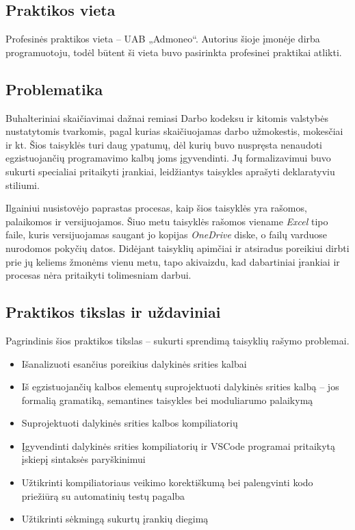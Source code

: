 
\subsection*{Praktikos vieta}

Profesinės praktikos vieta -- UAB „Admoneo“. Autorius šioje įmonėje dirba programuotoju, todėl būtent ši vieta buvo pasirinkta profesinei praktikai atlikti.

\subsection*{Problematika}

Buhalteriniai skaičiavimai dažnai remiasi Darbo kodeksu ir kitomis valstybės nustatytomis tvarkomis, pagal kurias skaičiuojamas darbo užmokestis, mokesčiai ir kt. Šios taisyklės turi daug ypatumų, dėl kurių buvo nuspręsta nenaudoti egzistuojančių programavimo kalbų joms įgyvendinti. Jų formalizavimui buvo sukurti specialiai pritaikyti įrankiai, leidžiantys taisykles aprašyti deklaratyviu stiliumi.

Ilgainiui nusistovėjo paprastas procesas, kaip šios taisyklės yra rašomos, palaikomos ir versijuojamos. Šiuo metu taisyklės rašomos viename \textit{Excel} tipo faile, kuris versijuojamas saugant jo kopijas \textit{OneDrive} diske, o failų varduose nurodomos pokyčių datos. Didėjant taisyklių apimčiai ir atsiradus poreikiui dirbti prie jų keliems žmonėms vienu metu, tapo akivaizdu, kad dabartiniai įrankiai ir procesas nėra pritaikyti tolimesniam darbui.

\subsection*{Praktikos tikslas ir uždaviniai}

Pagrindinis šios praktikos tikslas -- sukurti sprendimą taisyklių rašymo problemai.

\begin{itemize}
    \item Išanalizuoti esančius poreikius dalykinės srities kalbai

    \item Iš egzistuojančių kalbos elementų suprojektuoti dalykinės srities kalbą -- jos formalią gramatiką, semantines taisykles bei moduliarumo palaikymą
    
    \item Suprojektuoti dalykinės srities kalbos kompiliatorių

    \item Įgyvendinti dalykinės srities kompiliatorių ir VSCode programai pritaikytą įskiepį sintaksės paryškinimui

    \item Užtikrinti kompiliatoriaus veikimo korektiškumą bei palengvinti kodo priežiūrą su automatinių
    testų pagalba

    \item Užtikrinti sėkmingą sukurtų įrankių diegimą

\end{itemize}

